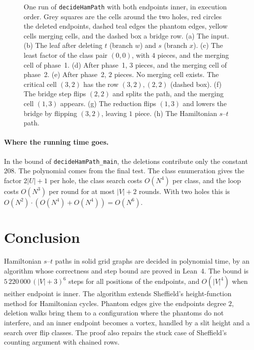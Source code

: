 \documentclass[11pt]{article}
\theoremstyle{plain}
\theoremstyle{definition}
\theoremstyle{remark}
\newcommand{\lean}[1]{\texttt{#1}}
\begin{document}
\begin{figure}[t]
\centering

\caption{One run of \lean{decideHamPath} with both endpoints inner, in execution order.
Grey squares are the cells around the two holes, red circles the deleted endpoints, dashed teal
edges the phantom edges, yellow cells merging cells, and the dashed box a bridge row.
(a) The input.
(b) The leaf after deleting $t$ (branch $w$) and $s$ (branch $x$).
(c) The least factor of the class pair $(0,0)$, with $4$ pieces, and the merging cell of phase~1.
(d) After phase~1, $3$ pieces, and the merging cell of phase~2.
(e) After phase~2, $2$ pieces.
No merging cell exists.
The critical cell $(3,2)$ has the row $(3,2),(2,2)$ (dashed box).
(f) The bridge step flips $(2,2)$ and splits the path, and the merging cell $(1,3)$ appears.
(g) The reduction flips $(1,3)$ and lowers the bridge by flipping $(3,2)$, leaving $1$ piece.
(h) The Hamiltonian $s$--$t$ path.}
\label{fig:bulk}
\end{figure}

\paragraph{Where the running time goes.}
In the bound of \lean{decideHamPath\_main}, the deletions contribute only the constant $208$.
The polynomial comes from the final test.
The class enumeration gives the factor $2|U|+1$ per hole, the class search costs $O(N^4)$ per class,
and the loop costs $O(N^3)$ per round for at most $|V|+2$ rounds.
With two holes this is $O(N^2)\cdot(O(N^4)+O(N^4))=O(N^6)$.

\section{Conclusion}
\label{sec:conclusion}

Hamiltonian $s$--$t$ paths in solid grid graphs are decided in polynomial time, by an algorithm
whose correctness and step bound are proved in Lean~4.
The bound is $5\,220\,000\,(|V|+3)^6$ steps for all positions of the endpoints, and
$O(|V|^4)$ when neither endpoint is inner.
The algorithm extends Sheffield's height-function method for Hamiltonian cycles.
Phantom edges give the endpoints degree $2$, deletion walks bring them to a configuration where
the phantoms do not interfere, and an inner endpoint becomes a vortex, handled by a slit height
and a search over flip classes.
The proof also repairs the stuck case of Sheffield's counting argument with chained rows.
\end{document}

